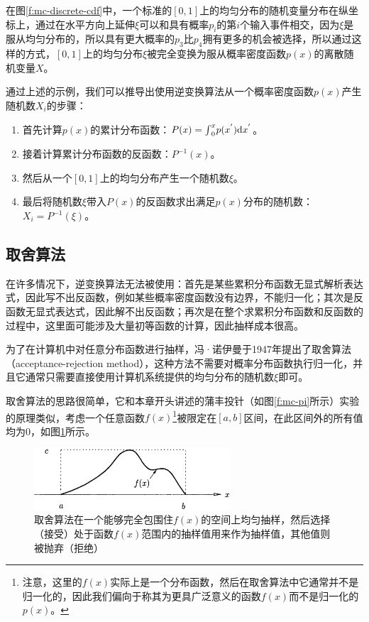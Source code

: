 在图\ref{f:mc-discrete-cdf}中，一个标准的$[0,1]$上的均匀分布的随机变量分布在纵坐标上，通过在水平方向上延伸$\xi$可以和具有概率$p_i$的第$i$个输入事件相交，因为$\xi$是服从均匀分布的，所以具有更大概率的$p_3$比$p_4$拥有更多的机会被选择，所以通过这样的方式，$[0,1]$上的均匀分布$\xi$被完全变换为服从概率密度函数$p(x)$的离散随机变量$X$。

通过上述的示例，我们可以推导出使用逆变换算法从一个概率密度函数$p(x)$产生随机数$X_i$的步骤：

\begin{enumerate}
	\item 首先计算$p(x)$的累计分布函数：$P(x)={\rm \int}_{0}^{x}p(x^{'}){\rm d}x^{'}$。
	\item 接着计算累计分布函数的反函数：$P^{-1}(x)$。
	\item 然后从一个$[0,1]$上的均匀分布产生一个随机数$\xi$。
	\item 最后将随机数$\xi$带入$P(x)$的反函数求出满足$p(x)$分布的随机数：$X_i=P^{-1}(\xi)$。
\end{enumerate}







\subsection{取舍算法}\label{sec:mc-accept-reject}
在许多情况下，逆变换算法无法被使用：首先是某些累积分布函数无显式解析表达式，因此写不出反函数，例如某些概率密度函数没有边界，不能归一化；其次是反函数无显式表达式，因此解不出反函数；再次是在整个求累积分布函数和反函数的过程中，这里面可能涉及大量初等函数的计算，因此抽样成本很高。

为了在计算机中对任意分布函数进行抽样，冯·诺伊曼于1947年提出了取舍算法（acceptance-rejection method），这种方法不需要对概率分布函数执行归一化，并且它通常只需要直接使用计算机系统提供的均匀分布的随机数$\xi$即可。

取舍算法的思路很简单，它和本章开头讲述的蒲丰投针（如图\ref{f:mc-pi}所示）实验的原理类似，考虑一个任意函数$f(x)$\footnote{注意，这里的$f(x)$实际上是一个分布函数，然后在取舍算法中它通常并不是归一化的，因此我们偏向于称其为更具广泛意义的函数$f(x)$而不是归一化的$p(x)$。}被限定在$[a,b]$区间，在此区间外的所有值均为0，如图\ref{f:mc-rejection-idea}所示。

\begin{figure}
\sidecaption
	\includegraphics[width=0.65\textwidth]{figures/mc/mc-6}
	\caption{取舍算法在一个能够完全包围住$f(x)$的空间上均匀抽样，然后选择（接受）处于函数$f(x)$范围内的抽样值用来作为抽样值，其他值则被抛弃（拒绝）}
	\label{f:mc-rejection-idea}
\end{figure}

